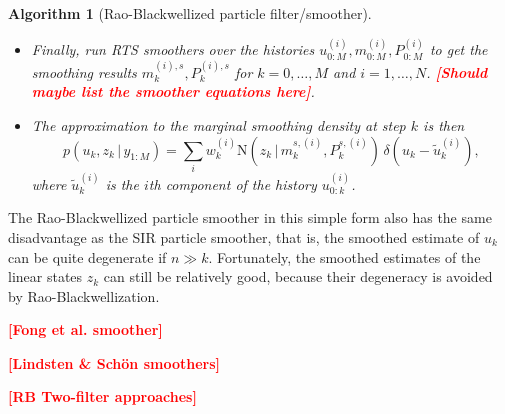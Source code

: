 \documentclass[twocolumn]{autart}    %
\newcommand{\comment}[1]{\textcolor{red}{\textbf{[#1]}}}
\newtheorem{algo}{Algorithm}[section]
\begin{document}
\begin{algo}[Rao-Blackwellized particle filter/smoother]
\begin{itemize}
\begin{enumerate}
\item Compute importance weights as follows:
  \begin{equation}
    w_k^{(i)} \propto w_{k-1}^{(i)}
     \frac{p(u_{k}^{(i)} \, | \, u_{k-1}^{(i)}) \,
          \mathrm{N}(y_k \, | \, \mu_k^{(i)},S_k^{(i)})}
          {q(u_{k}^{(i)} \, | \, u_{0:k-1}^{(i)},y_{1:k})}. \\
  \end{equation}

\item Resample the set of histories $\{
  w_k^{(i)},u_{0:k}^{(i)},m_{0:k}^{(i)},P_{0:k}^{(i)}~:~i=1,\ldots,N
  \}$ if needed.
\end{enumerate}

\item Finally, run RTS smoothers over the histories $u_{0:M}^{(i)}, m_{0:M}^{(i)}, P_{0:M}^{(i)}$
  to get the smoothing results $m_k^{(i),s},P_k^{(i),s}$ for $k=0,\ldots,M$ and $i=1,\ldots,N$.
  \comment{Should maybe list the smoother equations here}.

\item The approximation to the marginal smoothing density at step $k$
  is then
%
\begin{equation}
  p(u_k,z_k\,|\,y_{1:M})
  = \sum_i w_k^{(i)} \mathrm{N}(z_k\,|\,m_k^{s,(i)},P_k^{s,(i)}) \,
  \delta(u_k - \tilde{u}_k^{(i)}),
\nonumber
\end{equation}
%
where $\tilde{u}_k^{(i)}$ is the $i$th component of the history
$u_{0:k}^{(i)}$.
\end{itemize}
\end{algo}
%
The Rao-Blackwellized particle smoother in this simple form also has
the same disadvantage as the SIR particle smoother, that is, the
smoothed estimate of $u_{k}$ can be quite degenerate if $n \gg
k$. Fortunately, the smoothed estimates of the linear states $z_k$ can
still be relatively good, because their degeneracy is avoided by
Rao-Blackwellization.

\comment{Fong et al. smoother}

\comment{Lindsten \& Sch\"on smoothers}

\comment{RB Two-filter approaches}
\end{document}
